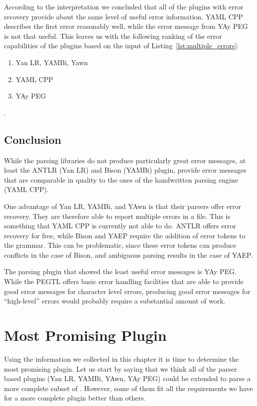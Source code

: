 According to the interpretation we concluded that all of the plugins with error recovery provide about the same level of useful error information. YAML CPP describes the first error reasonably well, while the error message from YAy PEG is not that useful. This leaves us with the following ranking of the error capabilities of the plugins based on the input of Listing~\ref{lst:multiple_errors}:

\begin{enumerate}
  \item Yan LR, YAMBi, Yawn
  \item YAML CPP
  \item YAy PEG
\end{enumerate}

.

\subsection{Conclusion}

While the parsing libraries do not produce particularly great error messages, at least the ANTLR (Yan LR) and Bison (YAMBi) plugin, provide error messages that are comparable in quality to the ones of the handwritten parsing engine (YAML CPP).

One advantage of Yan LR, YAMBi, and YAwn is that their parsers offer error recovery. They are therefore able to report multiple errors in a file. This is something that YAML CPP is currently not able to do. ANTLR offers error recovery for free, while Bison and YAEP require the addition of error tokens to the grammar. This can be problematic, since these error tokens can produce conflicts in the case of Bison, and ambiguous parsing results in the case of YAEP.

The parsing plugin that showed the least useful error messages is YAy PEG. While the PEGTL offers basic error handling facilities that are able to provide good error messages for character level errors, producing good error messages for “high-level” errors would probably require a substantial amount of work.

\section{Most Promising Plugin}

Using the information we collected in this chapter it is time to determine the most promising  plugin. Let us start by saying that we think all of the parser based  plugins (Yan LR, YAMBi, YAwn, YAy PEG) could be extended to parse a more complete subset of . However, some of them fit all the requirements we have for a more complete  plugin better than others.

